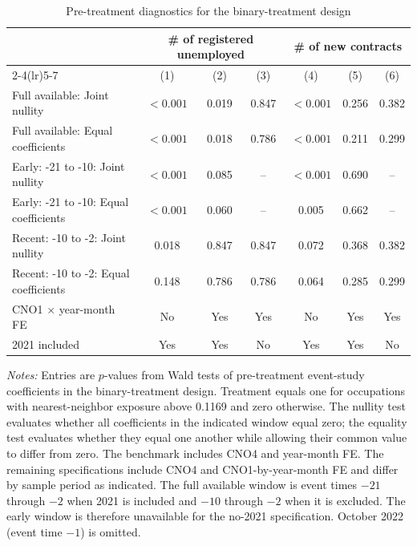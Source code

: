 \begin{table}[H]
\centering
\caption{Pre-treatment diagnostics for the binary-treatment design}
\label{tab:v1_binary_pretrends}
\begin{threeparttable}
\scriptsize
\renewcommand{\arraystretch}{0.90}
\setlength{\tabcolsep}{2.0pt}
\begin{tabular}{@{}lcccccc@{}}
\toprule
& \multicolumn{3}{c}{\# of registered unemployed} & \multicolumn{3}{c}{\# of new contracts} \\
\cmidrule(lr){2-4}\cmidrule(lr){5-7}
& (1) & (2) & (3) & (4) & (5) & (6) \\
\midrule
Full available: Joint nullity & $<0.001$ & 0.019 & 0.847 & $<0.001$ & 0.256 & 0.382 \\
Full available: Equal coefficients & $<0.001$ & 0.018 & 0.786 & $<0.001$ & 0.211 & 0.299 \\
Early: -21 to -10: Joint nullity & $<0.001$ & 0.085 & -- & $<0.001$ & 0.690 & -- \\
Early: -21 to -10: Equal coefficients & $<0.001$ & 0.060 & -- & 0.005 & 0.662 & -- \\
Recent: -10 to -2: Joint nullity & 0.018 & 0.847 & 0.847 & 0.072 & 0.368 & 0.382 \\
Recent: -10 to -2: Equal coefficients & 0.148 & 0.786 & 0.786 & 0.064 & 0.285 & 0.299 \\
\midrule
CNO1 $\times$ year-month FE & No & Yes & Yes & No & Yes & Yes \\
2021 included & Yes & Yes & No & Yes & Yes & No \\
\bottomrule
\end{tabular}
\begin{tablenotes}[flushleft]
\footnotesize
\item \emph{Notes:} Entries are $p$-values from Wald tests of pre-treatment event-study coefficients in the binary-treatment design. Treatment equals one for occupations with nearest-neighbor exposure above 0.1169 and zero otherwise. The nullity test evaluates whether all coefficients in the indicated window equal zero; the equality test evaluates whether they equal one another while allowing their common value to differ from zero. The benchmark includes CNO4 and year-month FE. The remaining specifications include CNO4 and CNO1-by-year-month FE and differ by sample period as indicated. The full available window is event times $-21$ through $-2$ when 2021 is included and $-10$ through $-2$ when it is excluded. The early window is therefore unavailable for the no-2021 specification. October 2022 (event time $-1$) is omitted.
\end{tablenotes}
\end{threeparttable}
\end{table}
